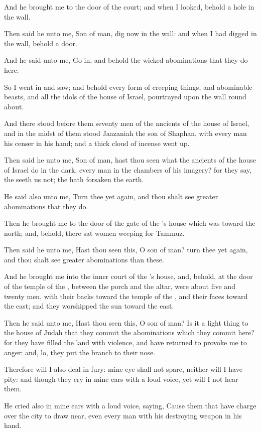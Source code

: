\Verse And he brought me to the door of the court; and when I looked, behold a hole in the wall.

\Verse Then said he unto me, Son of man, dig now in the wall: and when I had digged in the wall, behold a door.

\Verse And he said unto me, Go in, and behold the wicked abominations that they do here.

\Verse So I went in and saw; and behold every form of creeping things, and abominable beasts, and all the idols of the house of Israel, pourtrayed upon the wall round about.

\Verse And there stood before them seventy men of the ancients of the house of Israel, and in the midst of them stood Jaazaniah the son of Shaphan, with every man his censer in his hand; and a thick cloud of incense went up.

\Verse Then said he unto me, Son of man, hast thou seen what the ancients of the house of Israel do in the dark, every man in the chambers of his imagery? for they say, the \LORD seeth us not; the \LORD hath forsaken the earth.

\Verse He said also unto me, Turn thee yet again, and thou shalt see greater abominations that they do.

\Verse Then he brought me to the door of the gate of the \LORD's house which was toward the north; and, behold, there sat women weeping for Tammuz.

\Verse Then said he unto me, Hast thou seen this, O son of man? turn thee yet again, and thou shalt see greater abominations than these.

\Verse And he brought me into the inner court of the \LORD's house, and, behold, at the door of the temple of the \LORD, between the porch and the altar, were about five and twenty men, with their backs toward the temple of the \LORD, and their faces toward the east; and they worshipped the sun toward the east.

\Verse Then he said unto me, Hast thou seen this, O son of man? Is it a light thing to the house of Judah that they commit the abominations which they commit here? for they have filled the land with violence, and have returned to provoke me to anger: and, lo, they put the branch to their nose.

\Verse Therefore will I also deal in fury: mine eye shall not spare, neither will I have pity: and though they cry in mine ears with a loud voice, yet will I not hear them.


\Chapter
\Verse He cried also in mine ears with a loud voice, saying, Cause them that have charge over the city to draw near, even every man with his destroying weapon in his hand.

